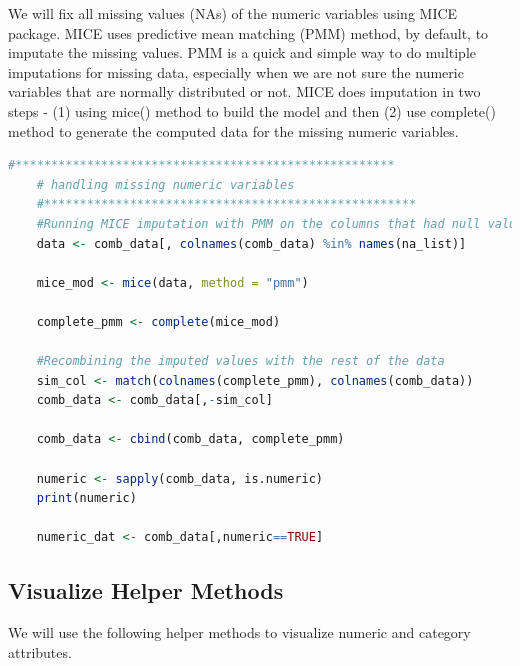 \documentclass[sigconf]{acmart}
\begin{document}
	We will fix all missing values (NAs) of the numeric variables using MICE package. MICE uses predictive mean matching (PMM) method, by default, to imputate the missing values. PMM is a quick and simple way to do multiple imputations for missing data, especially when we are not sure the numeric variables that are normally distributed or not. MICE does imputation in two steps - (1) using mice() method to build the model and then (2) use complete() method to generate the computed data for the missing numeric variables.
	
	\begin{lstlisting}[language=R]
	#*****************************************************
	# handling missing numeric variables
	#****************************************************
	#Running MICE imputation with PMM on the columns that had null values. This is reduce computation time.
	data <- comb_data[, colnames(comb_data) %in% names(na_list)]
	
	mice_mod <- mice(data, method = "pmm")
	
	complete_pmm <- complete(mice_mod)
	
	#Recombining the imputed values with the rest of the data
	sim_col <- match(colnames(complete_pmm), colnames(comb_data))
	comb_data <- comb_data[,-sim_col]
	
	comb_data <- cbind(comb_data, complete_pmm)
	
	numeric <- sapply(comb_data, is.numeric)
	print(numeric)
	
	numeric_dat <- comb_data[,numeric==TRUE]
	\end{lstlisting}
	
	\subsection{Visualize Helper Methods}

	We will use the following helper methods to visualize numeric and category attributes.
	
\end{document}
